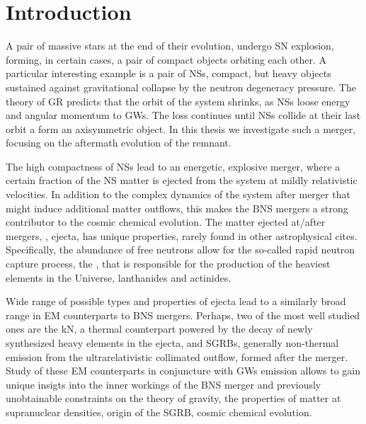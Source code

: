 
\chapter{Introduction} %

\label{ch:intro} %



A pair of massive stars at the end of their evolution, undergo \ac{SN} explosion, forming, 
in certain cases, a pair of compact objects orbiting each other. A particular interesting 
example is a pair of \acp{NS}, compact, but heavy objects sustained against gravitational 
collapse by the neutron degeneracy pressure. The theory of \ac{GR} predicts that the orbit 
of the system shrinks, as \acp{NS} loose energy and angular momentum to \acp{GW}. The 
loss continues until \acp{NS} collide at their last orbit a form an axisymmetric object.
In this thesis we investigate such a merger, focusing on the aftermath evolution of the 
remnant. 

The high compactness of \acp{NS} lead to an energetic, explosive merger, where a certain
fraction of the \ac{NS} matter is ejected from the system at mildly relativistic 
velocities. In addition to the complex dynamics of the system after merger that might 
induce additional matter outflows, this makes the \ac{BNS} mergers a strong contributor 
to the cosmic chemical evolution. The matter ejected at/after mergers, \ie, ejecta, has 
unique properties, rarely found in other astrophysical cites. Specifically, the abundance 
of free neutrons allow for the so-called rapid neutron capture process,
the \rproc{}, that is responsible for the production of the heaviest elements in the 
Universe, lanthanides and actinides. 

Wide range of possible types and properties of ejecta lead to a similarly broad 
range in \ac{EM} counterparts to \ac{BNS} mergers. Perhaps, two of the most 
well studied ones are the \ac{kN}, a thermal counterpart powered by the decay of 
newly synthesized heavy elements in the ejecta, and \acp{SGRB}, generally non-thermal 
emission from the ultrarelativistic collimated outflow, formed after the merger. 
Study of these \ac{EM} counterparts in conjuncture with \acp{GW} emission allows to 
gain unique insigts into the inner workings of the \ac{BNS} merger and previously 
unobtainable constraints on the theory of gravity, the properties of matter at 
supranuclear densities, origin of the \ac{SGRB}, cosmic chemical evolution. 

